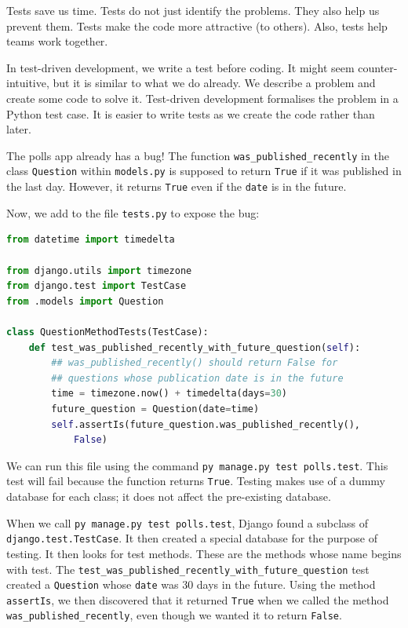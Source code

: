 \documentclass[a4paper, openany]{memoir}
\begin{document}
    Tests save us time. Tests do not just identify the problems. They also help us prevent them. Tests make the code more attractive (to others). Also, tests help teams work together.

    In test-driven development, we write a test before coding. It might seem counter-intuitive, but it is similar to what we do already. We describe a problem and create some code to solve it. Test-driven development formalises the problem in a Python test case. It is easier to write tests as we create the code rather than later.

    The polls app already has a bug! The function \texttt{was\_published\_recently} in the class \texttt{Question} within \texttt{models.py} is supposed to return \texttt{True} if it was published in the last day. However, it returns \texttt{True} even if the \texttt{date} is in the future.

    Now, we add to the file \texttt{tests.py} to expose the bug:
\begin{lstlisting}[language=python]
from datetime import timedelta

from django.utils import timezone
from django.test import TestCase
from .models import Question

class QuestionMethodTests(TestCase):
    def test_was_published_recently_with_future_question(self):
        ## was_published_recently() should return False for
        ## questions whose publication date is in the future
        time = timezone.now() + timedelta(days=30)
        future_question = Question(date=time)
        self.assertIs(future_question.was_published_recently(), 
            False)
\end{lstlisting}
    We can run this file using the command \texttt{py manage.py test polls.test}. This test will fail because the function returns \texttt{True}. Testing makes use of a dummy database for each class; it does not affect the pre-existing database.

    When we call \texttt{py manage.py test polls.test}, Django found a subclass of \texttt{django.test.TestCase}. It then created a special database for the purpose of testing. It then looks for test methods. These are the methods whose name begins with test. The \texttt{test\_was\_published\_recently\_with\_future\_question} test created a \texttt{Question} whose \texttt{date} was 30 days in the future. Using the method \texttt{assertIs}, we then discovered that it returned \texttt{True} when we called the method \texttt{was\_published\_recently}, even though we wanted it to return \texttt{False}. 
\end{document}
